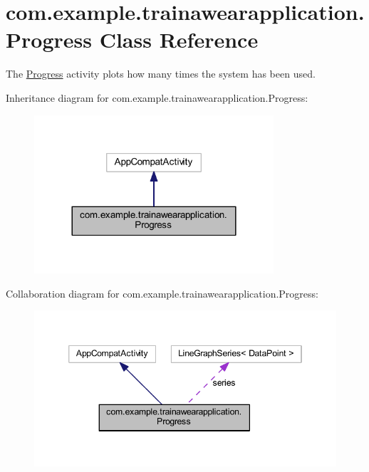 \hypertarget{classcom_1_1example_1_1trainawearapplication_1_1_progress}{}\section{com.\+example.\+trainawearapplication.\+Progress Class Reference}
\label{classcom_1_1example_1_1trainawearapplication_1_1_progress}


The \mbox{\hyperlink{classcom_1_1example_1_1trainawearapplication_1_1_progress}{Progress}} activity plots how many times the system has been used.  




Inheritance diagram for com.\+example.\+trainawearapplication.\+Progress\+:
\nopagebreak
\begin{figure}[H]
\begin{center}
\leavevmode
\includegraphics[width=252pt]{classcom_1_1example_1_1trainawearapplication_1_1_progress__inherit__graph}
\end{center}
\end{figure}


Collaboration diagram for com.\+example.\+trainawearapplication.\+Progress\+:
\nopagebreak
\begin{figure}[H]
\begin{center}
\leavevmode
\includegraphics[width=346pt]{classcom_1_1example_1_1trainawearapplication_1_1_progress__coll__graph}
\end{center}
\end{figure}
